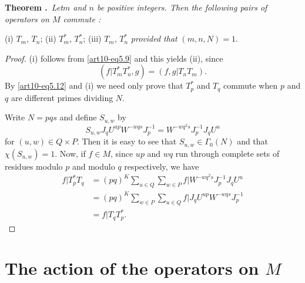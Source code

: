 \medskip
\noindent
{\bf Theorem .\label{art10-thm6.3}}~{\em Let\pageoriginale $m$ and $n$ be positive integers. Then the following pairs of operators on $M$ commute :}

(i) $T_{m}$, $T_{n}$; (ii) $T^{*}_{m}$, $T^{*}_{n}$; (iii) $T_{m}$, $T^{*}_{n}$ {\em provided that} $(m,n,N)=1$.

\begin{proof}
(i) follows from \eqref{art10-eq5.9} and this yields (ii), since
$$
(f|T^{*}_{m}T^{*}_{n},g)=(f,g|T_{n}T_{m}).
$$
By \eqref{art10-eq5.12} and (i) we need only prove that $T^{*}_{p}$ and $T_{q}$ commute when $p$ and $q$ are different primes dividing $N$.

Write $N=pqs$ and define $S_{u,w}$ by
$$
S_{u,w}J_{q}U^{up}W^{-wqs}J^{-1}_{p}=W^{-wq^{2}s}J^{-1}_{p}J_{q}U^{u}
$$
for $(u,w)\in Q\times P$. Then it is easy to see that $S_{u,w}\in \Gamma_{0}(N)$ and that $\chi(S_{u,w})=1$. Now, if $f\in M$, since $up$ and $wq$ run through complete sets of residues modulo $p$ and modulo $q$ respectively, we have
\begin{align*}
f|T^{*}_{p}T_{q} &= (pq)^{K}\sum\limits_{u\in Q}\sum\limits_{w\in P} f|W^{-wq^{2}s}J^{-1}_{p}J_{q}U^{u}\\[3pt]
&= (pq)^{K}\sum\limits_{w\in P}\sum\limits_{u\in Q}f|J_{q}U^{up}W^{-wqs}J^{-1}_{p}\\[3pt]
&= f|T_{q}T^{*}_{p}.
\end{align*}
\end{proof}

\section{The action of the operators on \texorpdfstring{$M$}{M}}\label{art10-sec7}
~

